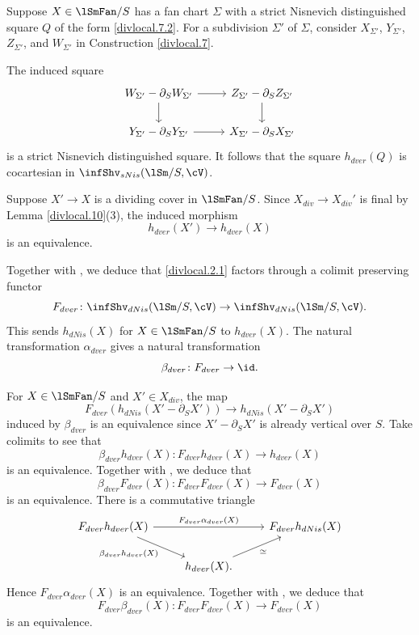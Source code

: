 \documentclass[10pt]{amsart}
\begin{document}
\begin{const}
\label{divlocal.11}
Suppose $X\in \lSmFan/S$ has a fan chart $\Sigma$ with a strict Nisnevich distinguished square $Q$ of the form \eqref{divlocal.7.2}.
For a subdivision $\Sigma'$ of $\Sigma$, consider $X_{\Sigma'}$, $Y_{\Sigma'}$, $Z_{\Sigma'}$, and $W_{\Sigma'}$ in Construction \ref{divlocal.7}.

The induced square
\[
\begin{tikzcd}
W_{\Sigma'}-\partial_S W_{\Sigma'}\ar[d]\ar[r]&
Z_{\Sigma'}-\partial_S Z_{\Sigma'}\ar[d]
\\
Y_{\Sigma'}-\partial_S Y_{\Sigma'}\ar[r]&
X_{\Sigma'}-\partial_S X_{\Sigma'}
\end{tikzcd}
\]
is a strict Nisnevich distinguished square.
It follows that the square $h_{dver}(Q)$ is cocartesian in $\infShv_{sNis}(\lSm/S,\cV)$.

Suppose $X'\to X$ is a dividing cover in $\lSmFan/S$.
Since $X_{div}\to X_{div}'$ is final by Lemma \ref{divlocal.10}(3), the induced morphism
\[
h_{dver}(X')
\to
h_{dver}(X)
\]
is an equivalence.

Together with \cite[Proposition 5.5.4.20]{HTT}, we deduce that \eqref{divlocal.2.1} factors through a colimit preserving functor
\begin{equation}
\label{divlocal.2.2}
F_{dver}
\colon
\infShv_{dNis}(\lSm/S,\cV)
\to
\infShv_{dNis}(\lSm/S,\cV).
\end{equation}
This sends $h_{dNis}(X)$ for $X\in \lSmFan/S$ to $h_{dver}(X)$.
The natural transformation $\alpha_{dver}$ gives a natural transformation
\begin{equation}
\beta_{dver}
\colon
F_{dver} \to \id.
\end{equation}

For $X\in \lSmFan/S$ and $X'\in X_{div}$, the map
\[
F_{dver}(h_{dNis}(X'-\partial_S X'))
\to
h_{dNis}(X'-\partial_S X')
\]
induced by $\beta_{dver}$ is an equivalence since $X'-\partial_S X'$ is already vertical over $S$.
Take colimits to see that 
\[
\beta_{dver}h_{dver}(X)
\colon
F_{dver}h_{dver}(X)\to h_{dver}(X)
\]
is an equivalence.
Together with \cite[Theorem 5.1.5.6, Proposition 5.5.4.20]{HTT}, we deduce that
\begin{equation}
\label{divlocal.2.6}
\beta_{dver}F_{dver}(X)
\colon
F_{dver}F_{dver}(X)\to F_{dver}(X)
\end{equation}
is an equivalence.
There is a commutative triangle
\[
\begin{tikzcd}
F_{dver}h_{dver}(X)\ar[rd,"\beta_{dver}h_{dver}(X)"']\ar[rr,"F_{dver}\alpha_{dver}(X)"]&
&
F_{dver}h_{dNis}(X)\ar[ld,"\simeq",leftarrow]
\\
&
h_{dver}(X).
\end{tikzcd}
\]
Hence $F_{dver}\alpha_{dver}(X)$ is an equivalence.
Together with \cite[Theorem 5.1.5.6, Proposition 5.5.4.20]{HTT}, we deduce that
\begin{equation}
\label{divlocal.2.7}
F_{dver}\beta_{dver}(X)
\colon
F_{dver}F_{dver}(X)\to F_{dver}(X)
\end{equation}
is an equivalence.


\end{const}
\end{document}
